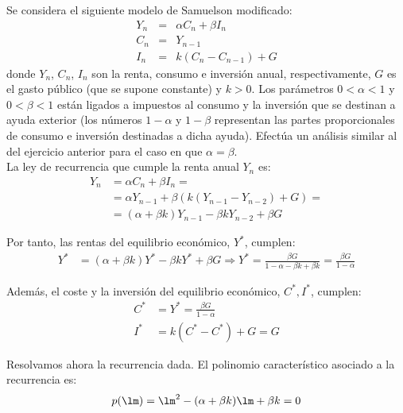 \begin{ejercicio}
    Se considera el siguiente modelo de Samuelson modificado:
    \begin{equation*}
        \begin{array}{rcl}
            Y_n & = & \alpha C_n + \beta I_n\\
            C_n & = & Y_{n-1}\\
            I_n & = & k(C_n - C_{n-1}) + G
        \end{array}
    \end{equation*}
    donde $Y_n$, $C_n$, $I_n$ son la renta, consumo e inversión anual, respectivamente, $G$ es el gasto público (que se supone
    constante) y $k > 0$. Los parámetros $0 < \alpha < 1$ y $0 < \beta < 1$ están ligados a impuestos al consumo y la inversión
    que se destinan a ayuda exterior (los números $1 - \alpha$ y $1 - \beta$ representan las partes proporcionales de consumo e
    inversión destinadas a dicha ayuda). Efectúa un análisis similar al del ejercicio anterior para el caso en que $\alpha = \beta$.\\

    La ley de recurrencia que cumple la renta anual $Y_n$ es:
    \begin{align*}
        Y_n &= \alpha C_n + \beta I_n =\\
        &= \alpha Y_{n-1} + \beta\left(k(Y_{n-1} - Y_{n-2}) + G\right)
        =\\&= (\alpha+\beta k)Y_{n-1} - \beta k Y_{n-2} + \beta G
    \end{align*}

    Por tanto, las rentas del equilibrio económico, $Y^\ast$, cumplen:
    \begin{align*}
        Y^\ast &= (\alpha+\beta k)Y^\ast - \beta k Y^\ast + \beta G
        \Longrightarrow Y^\ast = \frac{\beta G}{1-\alpha-\beta k + \beta k}
        = \frac{\beta G}{1-\alpha}
    \end{align*}

    Además, el coste y la inversión del equilibrio económico, $C^\ast,I^\ast$, cumplen:
    \begin{align*}
        C^\ast &= Y^\ast = \frac{\beta G}{1-\alpha}\\
        I^\ast &= k(C^\ast - C^\ast) + G = G
    \end{align*}

    Resolvamos ahora la recurrencia dada. El polinomio característico asociado a la recurrencia es:
    \begin{equation*}
        p(\lm) = \lm^2 - (\alpha+\beta k)\lm + \beta k = 0
    \end{equation*}


\end{ejercicio}
